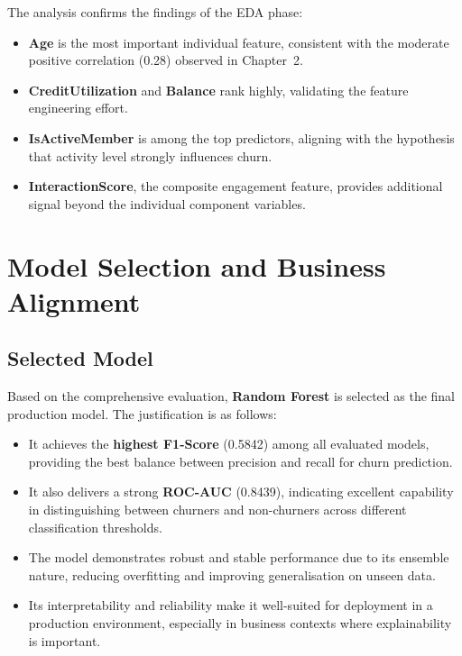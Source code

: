 The analysis confirms the findings of the EDA phase:
\begin{itemize}
    \item \textbf{Age} is the most important individual feature, consistent with the moderate positive correlation (0.28) observed in Chapter~2.
    \item \textbf{CreditUtilization} and \textbf{Balance} rank highly, validating the feature engineering effort.
    \item \textbf{IsActiveMember} is among the top predictors, aligning with the hypothesis that activity level strongly influences churn.
    \item \textbf{InteractionScore}, the composite engagement feature, provides additional signal beyond the individual component variables.
\end{itemize}

\section{Model Selection and Business Alignment}

\subsection{Selected Model}

Based on the comprehensive evaluation, \textbf{Random Forest} is selected as the final production model. The justification is as follows:

\begin{itemize}
    \item It achieves the \textbf{highest F1-Score} (0.5842) among all evaluated models, providing the best balance between precision and recall for churn prediction.
    \item It also delivers a strong \textbf{ROC-AUC} (0.8439), indicating excellent capability in distinguishing between churners and non-churners across different classification thresholds.
    \item The model demonstrates robust and stable performance due to its ensemble nature, reducing overfitting and improving generalisation on unseen data.
    \item Its interpretability and reliability make it well-suited for deployment in a production environment, especially in business contexts where explainability is important.
\end{itemize}


